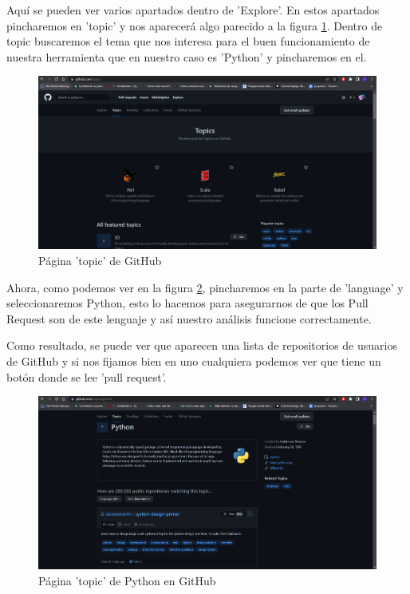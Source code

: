 \documentclass[a4paper, 12pt]{book}
\begin{document}
Aquí se pueden ver varios apartados dentro de 'Explore'. En estos apartados pincharemos en 'topic' y nos aparecerá algo parecido a la figura \ref{figura:git2}. Dentro de topic buscaremos el tema que nos interesa para el buen funcionamiento de nuestra herramienta que en nuestro caso es 'Python' y pincharemos en el.

\begin{figure}
    \includegraphics[bb=0 0 800 600, width=12cm, keepaspectratio]{img/git2}
    \caption{Página 'topic' de GitHub}
    \label{figura:git2}
 \end{figure}
 
Ahora, como podemos ver en la figura \ref{figura:git3}, pincharemos en la parte de 'language' y seleccionaremos Python, esto lo hacemos para asegurarnos de que los Pull Request son de este lenguaje y así nuestro análisis funcione correctamente.

Como resultado, se puede ver que aparecen una lista de repositorios de usuarios de GitHub y si nos fijamos bien en uno cualquiera podemos ver que tiene un botón donde se lee 'pull request'. 

\begin{figure}
    \includegraphics[bb=0 0 800 600, width=12cm, keepaspectratio]{img/git3}
    \caption{Página 'topic' de Python en GitHub}
    \label{figura:git3}
 \end{figure}
 
\end{document}
